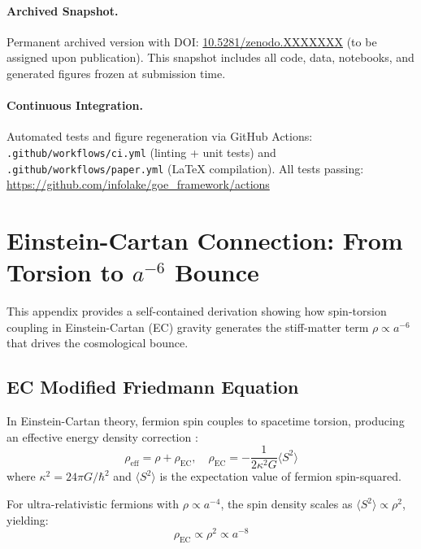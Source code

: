 \documentclass[12pt]{article}
\theoremstyle{definition}
\theoremstyle{plain}
\begin{document}
\paragraph{Archived Snapshot.}
Permanent archived version with DOI: \href{https://doi.org/10.5281/zenodo.XXXXXXX}{10.5281/zenodo.XXXXXXX} (to be assigned upon publication). This snapshot includes all code, data, notebooks, and generated figures frozen at submission time.

\paragraph{Continuous Integration.}
Automated tests and figure regeneration via GitHub Actions: \texttt{.github/workflows/ci.yml} (linting + unit tests) and \texttt{.github/workflows/paper.yml} (LaTeX compilation). All tests passing: \url{https://github.com/infolake/goe_framework/actions}

\appendix

\section{Einstein-Cartan Connection: From Torsion to $a^{-6}$ Bounce}
\label{app:einstein_cartan}

This appendix provides a self-contained derivation showing how spin-torsion coupling in Einstein-Cartan (EC) gravity generates the stiff-matter term $\rho \propto a^{-6}$ that drives the cosmological bounce.

\subsection{EC Modified Friedmann Equation}

In Einstein-Cartan theory, fermion spin couples to spacetime torsion, producing an effective energy density correction \cite{poplawski2010cosmology}:
\begin{equation}
\rho_{\text{eff}} = \rho + \rho_{\text{EC}}, \quad \rho_{\text{EC}} = -\frac{1}{2\kappa^2 G} \langle S^2 \rangle
\end{equation}
where $\kappa^2 = 24\pi G/\hbar^2$ and $\langle S^2 \rangle$ is the expectation value of fermion spin-squared.

For ultra-relativistic fermions with $\rho \propto a^{-4}$, the spin density scales as $\langle S^2 \rangle \propto \rho^2$, yielding:
\begin{equation}
\rho_{\text{EC}} \propto \rho^2 \propto a^{-8}
\end{equation}
\end{document}
